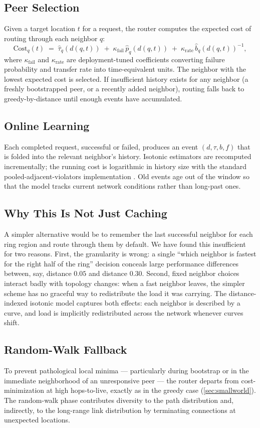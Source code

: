 \subsection{Peer Selection}

Given a target location $t$ for a request, the router computes the expected cost of routing through each neighbor $q$:
\[
  \mathrm{Cost}_q(t) \;=\; \widehat{\tau}_q(d(q, t)) \;+\; \kappa_{\mathrm{fail}}\, \widehat{p}_q(d(q, t)) \;+\; \kappa_{\mathrm{rate}}\, \widehat{b}_q(d(q, t))^{-1},
\]
where $\kappa_{\mathrm{fail}}$ and $\kappa_{\mathrm{rate}}$ are deployment-tuned coefficients converting failure probability and transfer rate into time-equivalent units. The neighbor with the lowest expected cost is selected. If insufficient history exists for any neighbor (a freshly bootstrapped peer, or a recently added neighbor), routing falls back to greedy-by-distance until enough events have accumulated.

\subsection{Online Learning}

Each completed request, successful or failed, produces an event $(d, \tau, b, f)$ that is folded into the relevant neighbor's history. Isotonic estimators are recomputed incrementally; the running cost is logarithmic in history size with the standard pooled-adjacent-violators implementation \citep{barlow1972statistical}. Old events age out of the window so that the model tracks current network conditions rather than long-past ones.

\subsection{Why This Is Not Just Caching}

A simpler alternative would be to remember the last successful neighbor for each ring region and route through them by default. We have found this insufficient for two reasons. First, the granularity is wrong: a single ``which neighbor is fastest for the right half of the ring'' decision conceals large performance differences between, say, distance $0.05$ and distance $0.30$. Second, fixed neighbor choices interact badly with topology changes: when a fast neighbor leaves, the simpler scheme has no graceful way to redistribute the load it was carrying. The distance-indexed isotonic model captures both effects: each neighbor is described by a curve, and load is implicitly redistributed across the network whenever curves shift.

\subsection{Random-Walk Fallback}

To prevent pathological local minima --- particularly during bootstrap or in the immediate neighborhood of an unresponsive peer --- the router departs from cost-minimization at high hops-to-live, exactly as in the greedy case (\cref{sec:smallworld}). The random-walk phase contributes diversity to the path distribution and, indirectly, to the long-range link distribution by terminating connections at unexpected locations.
